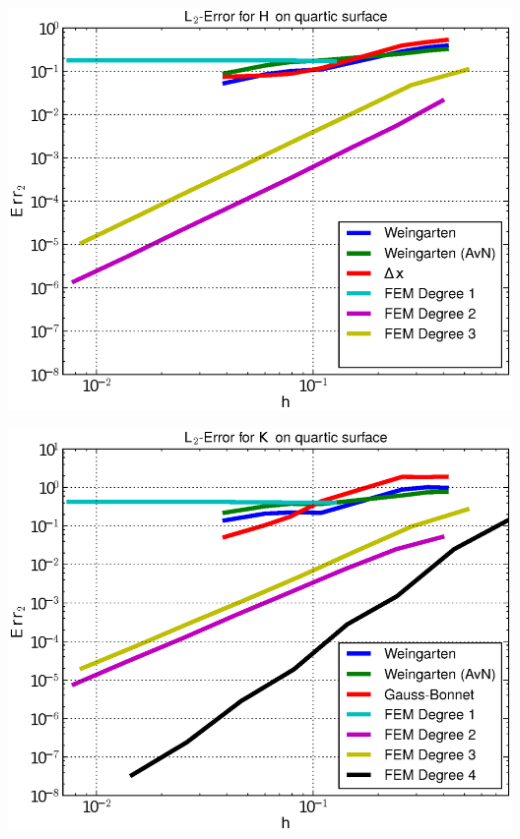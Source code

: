 \documentclass{beamer}
\begin{document}
\begin{frame}
\begin{overprint}
\begin{minipage}[t]{0.49\textwidth}
            \centering\includegraphics[width=\textwidth]{bilder/Curvature/heineB/ErrHL2_6.eps}
          \end{minipage}
          \begin{minipage}[t]{0.49\textwidth}
            \centering\includegraphics[width=\textwidth]{bilder/Curvature/heineB/ErrKL2_7.eps}
          \end{minipage}\hfill
          \begin{minipage}[t]{0.49\textwidth}

\end{minipage}
\end{overprint}
\end{frame}
\end{document}
